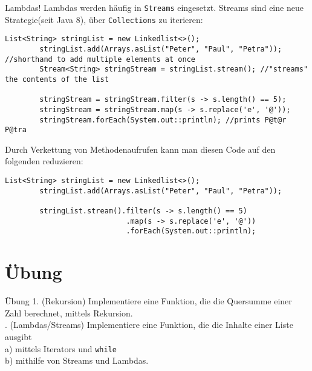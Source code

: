 \begin{frame}[fragile]{Lambdas!}
    Lambdas werden häufig in \texttt{Streams} eingesetzt. Streams sind eine neue Strategie(seit Java 8), über \texttt{Collections} zu iterieren:
    \begin{lstlisting}[gobble=8,basicstyle=\ttfamily\scriptsize]
        List<String> stringList = new Linkedlist<>();
        stringList.add(Arrays.asList("Peter", "Paul", "Petra")); //shorthand to add multiple elements at once
        Stream<String> stringStream = stringList.stream(); //"streams" the contents of the list
        
        stringStream = stringStream.filter(s -> s.length() == 5); 
        stringStream = stringStream.map(s -> s.replace('e', '@'));
        stringStream.forEach(System.out::println); //prints P@t@r P@tra
    \end{lstlisting}
    \pause
    Durch Verkettung von Methodenaufrufen kann man diesen Code auf den folgenden reduzieren:
    \begin{lstlisting}[gobble=8,basicstyle=\ttfamily\scriptsize]
        List<String> stringList = new Linkedlist<>();
        stringList.add(Arrays.asList("Peter", "Paul", "Petra"));
        
        stringList.stream().filter(s -> s.length() == 5)
                            .map(s -> s.replace('e', '@'))
                            .forEach(System.out::println); 
    \end{lstlisting}
\end{frame}

\section{Übung}

\begin{frame}{Übung}
    \center
    \large{
        1. (Rekursion) Implementiere eine Funktion, die die Quersumme einer Zahl berechnet, mittels Rekursion. \\
        . (Lambdas/Streams) Implementiere eine Funktion, die die Inhalte einer Liste ausgibt \\
        a) mittels Iterators und \texttt{while} \\
        b) mithilfe von Streams und Lambdas.
    }
\end{frame}



